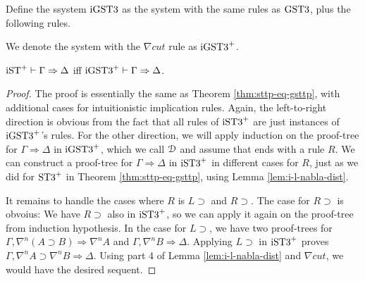\documentclass[10pt,a4paper]{amsart}
\begin{document}
\begin{dfn}[$\igstt$]
	Define the ssystem $\igstt$ as the system with the same rules as $\gstt$, plus the following rules.
  \begin{multicols}{2}
    \begin{prooftree}
    \end{prooftree}
    \columnbreak
    \begin{prooftree}
    \end{prooftree}
  \end{multicols}

We denote the system with the $\nabla cut$ rule as $\igstt^+$.
\end{dfn}

\begin{thm}\label{thm:isttp-eq-igsttp}
	$\ist^+ \vdash \Gamma \Rightarrow \Delta$ iff $\igstt^+ \vdash \Gamma \Rightarrow \Delta$.
\end{thm}
\begin{proof}
	The proof is essentially the same as Theorem \ref{thm:sttp-eq-gsttp}, with additional cases for intuitionistic implication rules. Again, the left-to-right direction is obvious from the fact that all rules of $\istt^+$ are just instances of $\igstt^+$'s rules. For the other direction, we will apply induction on the proof-tree for $\Gamma \Rightarrow \Delta$ in $\igstt^+$, which we call $\D$ and assume that ends with a rule $R$. We can construct a proof-tree for $\Gamma \Rightarrow \Delta$ in $\istt^+$ in different cases for $R$, just as we did for $\stt^+$ in Theorem \ref{thm:sttp-eq-gsttp}, using Lemma \ref{lem:i-l-nabla-dist}.

	It remains to handle the cases where $R$ is $L \supset$ and $R \supset$. The case for $R \supset$ is obvoius: We have $R \supset$ also in $\istt^+$, so we can apply it again on the proof-tree from induction hypothesis. In the case for $L \supset$, we have two proof-trees for $\Gamma, \nabla^n (A \supset B) \Rightarrow \nabla^n A$ and $\Gamma, \nabla^n B \Rightarrow \Delta$. Applying $L \supset$ in $\istt^+$ proves $\Gamma, \nabla^n A \supset \nabla^n B \Rightarrow \Delta$. Using part 4 of Lemma \ref{lem:i-l-nabla-dist} and $\nabla cut$, we would have the desired sequent.
\end{proof}
\end{document}
